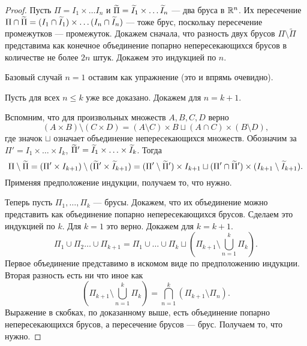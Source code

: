 	\begin{proof}
		Пусть $\Pi = I_1 \times \ldots I_n$ и $\widetilde{\Pi} = \widetilde{I}_1 \times \ldots \widetilde{I}_n$ --- два бруса в $\mathbb{R}^n$. Их пересечение $\Pi \cap \widetilde{\Pi} = (I_1 \cap \widetilde{I}_1) \times \ldots (I_n\cap \widetilde{I}_n)$ --- тоже брус, поскольку пересечение промежутков --- промежуток.
		Докажем сначала, что разность двух брусов $\Pi \setminus \widetilde{\Pi}$ представима как конечное объединение попарно непересекающихся брусов в количестве не более $2n$ штук. Докажем это индукцией по $n$.
		\par Базовый случай $n=1$ оставим как упражнение (это и впрямь очевидно).
		\par Пусть для всех $n \leqslant k$ уже все доказано. Докажем для $n = k + 1$. 
		\par Вспомним, что для произвольных множеств $A, B, C, D$ верно
		$$
			(A\times B) \setminus (C \times D) = (A \setminus C) \times B \sqcup (A\cap C)\times (B \setminus D),
		$$
		где значок $\sqcup$ означает объединение непересекающихся множеств.
		Обозначим за $\Pi' = I_1 \times \ldots \times I_k$, $\widetilde{\Pi}' = \widetilde{I}_1 \times \ldots \times \widetilde{I}_k$. Тогда
		$$
			\Pi \setminus \widetilde{\Pi} = (\Pi' \times I_{k+1}) \setminus (\widetilde{\Pi}' \times \widetilde{I}_{k + 1}) = (\Pi' \setminus \widetilde{\Pi}')\times I_{k + 1} \sqcup (\Pi' \cap \widetilde{\Pi}')\times (I_{k + 1} \setminus \widetilde{I}_{k + 1}).
		$$
		Применяя предположение индукции, получаем то, что нужно.
		\par Теперь пусть $\Pi_1, \ldots, \Pi_k$ --- брусы. Докажем, что их объединение можно представить как объединение попарно непересекающихся брусов. Сделаем это индукцией по $k$. Для $k = 1$ это верно. Докажем для $k = k + 1$.
		$$
			\Pi_1 \cup \Pi_2 \ldots \cup \Pi_{k + 1} = \Pi_1 \cup \ldots \cup \Pi_{k} \sqcup \left(\Pi_{k + 1} \setminus \bigcup\limits_{n =1}^k\Pi_k\right).
		$$
		Первое объединение представимо в искомом виде по предположению индукции. Вторая разность есть ни что иное как
		$$
			\left(\Pi_{k + 1} \setminus \bigcup\limits_{n =1}^k\Pi_k\right) = \bigcap\limits_{n=1}^{k}(\Pi_{k + 1} \setminus \Pi_n).
		$$
		Выражение в скобках, по доказанному выше, есть объединение попарно непересекающихся брусов, а пересечение брусов --- брус. Получаем то, что нужно.
	\end{proof}